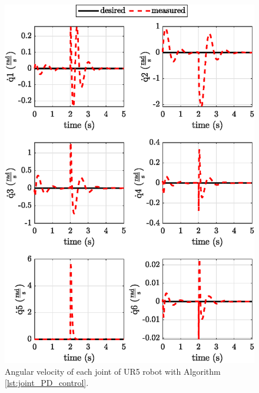 \begin{figure}
    \centering
    \includegraphics{images/act_1.3/joint_velocity.eps}
    \caption{Angular velocity of each joint of UR5 robot with Algorithm \ref{lst:joint_PD_control}.}
    \label{fig:act_1.3_joint_velocity}
\end{figure}


